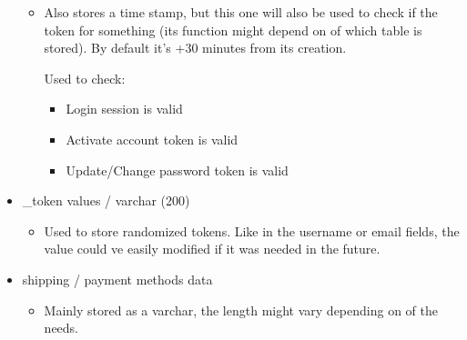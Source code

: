 \begin{flushleft}
\begin{itemize}
\begin{itemize}
            \item Also stores a time stamp, but this one will also be used to check if the token for something (its function
            might depend on of which table is stored).
            By default  it's +30 minutes from its creation.
            \begin{flushleft}
            Used to check:
                \begin{itemize}
                    \item Login session is valid
                    \item Activate account token is valid
                    \item Update/Change password token is valid
                \end{itemize}
            \end{flushleft}
        \end{itemize}
        \item \_token values / varchar (200)
        \begin{itemize}
            \item Used to store randomized tokens.
            Like in the username or email fields, the value could ve easily modified if it was needed in the future.
        \end{itemize}
        \item shipping / payment methods data
        \begin{itemize}
            \item Mainly stored as a varchar, the length might vary depending on of the needs.
        \end{itemize}
    \end{itemize}
\end{flushleft}

\newpage
